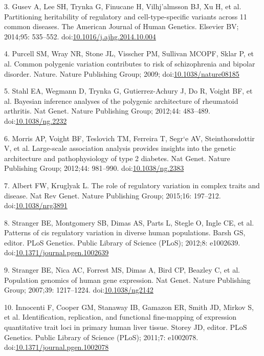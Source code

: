 \documentclass[]{article}
\begin{document}
3. Gusev A, Lee SH, Trynka G, Finucane H, Vilhj{\a'a}lmsson BJ, Xu H, et
al. Partitioning heritability of regulatory and cell-type-specific
variants across 11 common diseases. The American Journal of Human
Genetics. Elsevier BV; 2014;95: 535--552.
doi:\href{http://dx.doi.org/10.1016/j.ajhg.2014.10.004}{10.1016/j.ajhg.2014.10.004}

4. Purcell SM, Wray NR, Stone JL, Visscher PM, Sullivan MCOPF, Sklar P,
et al. Common polygenic variation contributes to risk of schizophrenia
and bipolar disorder. Nature. Nature Publishing Group; 2009;
doi:\href{http://dx.doi.org/10.1038/nature08185}{10.1038/nature08185}

5. Stahl EA, Wegmann D, Trynka G, Gutierrez-Achury J, Do R, Voight BF,
et al. Bayesian inference analyses of the polygenic architecture of
rheumatoid arthritis. Nat Genet. Nature Publishing Group; 2012;44:
483--489. doi:\href{http://dx.doi.org/10.1038/ng.2232}{10.1038/ng.2232}

6. Morris AP, Voight BF, Teslovich TM, Ferreira T, Segr{\a`e} AV,
Steinthorsdottir V, et al. Large-scale association analysis provides
insights into the genetic architecture and pathophysiology of type 2
diabetes. Nat Genet. Nature Publishing Group; 2012;44: 981--990.
doi:\href{http://dx.doi.org/10.1038/ng.2383}{10.1038/ng.2383}

7. Albert FW, Kruglyak L. The role of regulatory variation in complex
traits and disease. Nat Rev Genet. Nature Publishing Group; 2015;16:
197--212. doi:\href{http://dx.doi.org/10.1038/nrg3891}{10.1038/nrg3891}

8. Stranger BE, Montgomery SB, Dimas AS, Parts L, Stegle O, Ingle CE, et
al. Patterns of cis regulatory variation in diverse human populations.
Barsh GS, editor. PLoS Genetics. Public Library of Science (PLoS);
2012;8: e1002639.
doi:\href{http://dx.doi.org/10.1371/journal.pgen.1002639}{10.1371/journal.pgen.1002639}

9. Stranger BE, Nica AC, Forrest MS, Dimas A, Bird CP, Beazley C, et al.
Population genomics of human gene expression. Nat Genet. Nature
Publishing Group; 2007;39: 1217--1224.
doi:\href{http://dx.doi.org/10.1038/ng2142}{10.1038/ng2142}

10. Innocenti F, Cooper GM, Stanaway IB, Gamazon ER, Smith JD, Mirkov S,
et al. Identification, replication, and functional fine-mapping of
expression quantitative trait loci in primary human liver tissue. Storey
JD, editor. PLoS Genetics. Public Library of Science (PLoS); 2011;7:
e1002078.
doi:\href{http://dx.doi.org/10.1371/journal.pgen.1002078}{10.1371/journal.pgen.1002078}
\end{document}
